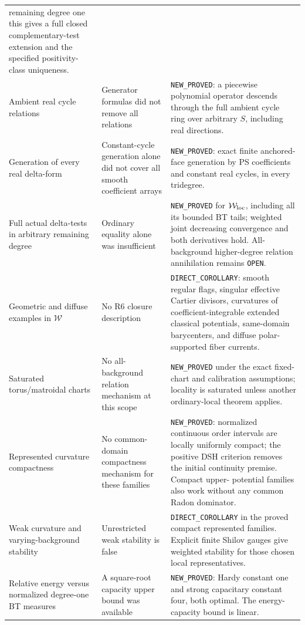 \documentclass[11pt,a4paper]{article}
\numberwithin{equation}{section}
\theoremstyle{definition}
\theoremstyle{remark}
\begin{document}
\begin{longtable}{@{}p{}p{}p{}@{}}
remaining degree one this gives a full closed complementary-test
extension and the specified positivity-class uniqueness.\\[4pt]
Ambient real cycle relations & Generator formulas did not remove
all relations & \texttt{NEW\_PROVED}: a piecewise polynomial
operator descends through the full ambient cycle ring over arbitrary
$S$, including real directions.\\[4pt]
Generation of every real delta-form & Constant-cycle generation
alone did not cover all smooth coefficient arrays &
\texttt{NEW\_PROVED}: exact finite anchored-face generation by
PS coefficients and constant real cycles, in every tridegree.\\[4pt]
Full actual delta-tests in arbitrary remaining degree & Ordinary
equality alone was insufficient & \texttt{NEW\_PROVED} for
$\mathcal W_{\rm loc}$, including all its bounded BT tails;
weighted joint decreasing convergence and both derivatives hold.
All-background higher-degree relation annihilation remains
\texttt{OPEN}.\\[4pt]
Geometric and diffuse examples in $\mathcal W$ & No R6 closure
description & \texttt{DIRECT\_COROLLARY}: smooth regular flags, singular effective
Cartier divisors, curvatures of coefficient-integrable extended
classical potentials, same-domain barycenters, and diffuse
polar-supported fiber currents.\\[4pt]
Saturated torus/matroidal charts & No all-background relation
mechanism at this scope & \texttt{NEW\_PROVED} under the exact
fixed-chart and calibration assumptions; locality is saturated
unless another ordinary-local theorem applies.\\[4pt]
Represented curvature compactness & No common-domain compactness
mechanism for these families & \texttt{NEW\_PROVED}: normalized
continuous order intervals are locally uniformly compact; the positive
DSH criterion removes the initial continuity premise. Compact upper-
potential families also work without any common Radon dominator.\\[4pt]
Weak curvature and varying-background stability & Unrestricted weak
stability is false & \texttt{DIRECT\_COROLLARY} in the proved compact
represented families. Explicit finite Shilov gauges give weighted
stability for those chosen local representatives.\\[4pt]
Relative energy versus normalized degree-one BT measures & A
square-root capacity upper bound was available &
\texttt{NEW\_PROVED}: Hardy constant one and strong capacitary
constant four, both optimal. The energy-capacity bound is linear.\\[4pt]

\end{longtable}
\end{document}
